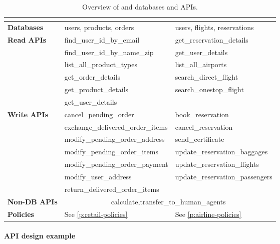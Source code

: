 \begin{table}[h]

\centering
\begin{tabular}{lll}
\toprule
 & \textbf{\retail{}} & \textbf{\airline{}} \\
\midrule 
\textbf{Databases} & users, products, orders & users, flights, reservations \\
\midrule
\textbf{Read APIs} & find\_user\_id\_by\_email & get\_reservation\_details \\
& find\_user\_id\_by\_name\_zip & get\_user\_details \\
& list\_all\_product\_types & list\_all\_airports \\
& get\_order\_details & search\_direct\_flight \\
& get\_product\_details  & search\_onestop\_flight \\
& get\_user\_details & \\ 
\midrule
\textbf{Write APIs} & cancel\_pending\_order & book\_reservation \\
& exchange\_delivered\_order\_items & cancel\_reservation \\
& modify\_pending\_order\_address & send\_certificate \\
& modify\_pending\_order\_items & update\_reservation\_baggages \\
& modify\_pending\_order\_payment & update\_reservation\_flights \\
& modify\_user\_address & update\_reservation\_passengers \\
& return\_delivered\_order\_items & \\
\midrule
\textbf{Non-DB APIs} & \multicolumn{2}{c}{calculate,\quad transfer\_to\_human\_agents} \\
\midrule
\textbf{Policies} & See \ref{p:retail-policies} & See \ref{p:airline-policies} \\
\bottomrule
\end{tabular}
\label{tab:domains_rich}
\vspace{10pt}
\caption{Overview of \retail{} and \airline{} databases and APIs.}

\end{table}

\paragraph{API design example} 

